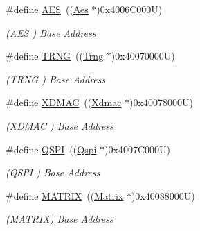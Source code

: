 \begin{DoxyCompactItemize}
\mbox{\label{group__SAME70J21__base_ga5412ac9ff64f4ab68c289a0da739eaef}} 
\#define \mbox{\hyperlink{group__SAME70J21__base_ga5412ac9ff64f4ab68c289a0da739eaef}{A\+ES}}~((\mbox{\hyperlink{structAes}{Aes}}    $\ast$)0x4006\+C000\+U)
\begin{DoxyCompactList}\small\item\em (A\+ES ) Base Address \end{DoxyCompactList}\item 
\mbox{\label{group__SAME70J21__base_ga4cab97ed4b9b87448b2338e4c13c9862}} 
\#define \mbox{\hyperlink{group__SAME70J21__base_ga4cab97ed4b9b87448b2338e4c13c9862}{T\+R\+NG}}~((\mbox{\hyperlink{structTrng}{Trng}}   $\ast$)0x40070000\+U)
\begin{DoxyCompactList}\small\item\em (T\+R\+NG ) Base Address \end{DoxyCompactList}\item 
\mbox{\label{group__SAME70J21__base_ga605482ac0afa782a315f3b556c2f018b}} 
\#define \mbox{\hyperlink{group__SAME70J21__base_ga605482ac0afa782a315f3b556c2f018b}{X\+D\+M\+AC}}~((\mbox{\hyperlink{structXdmac}{Xdmac}}  $\ast$)0x40078000\+U)
\begin{DoxyCompactList}\small\item\em (X\+D\+M\+AC ) Base Address \end{DoxyCompactList}\item 
\mbox{\label{group__SAME70J21__base_gac24e1e8116a508fa623bdaf91e7f9b63}} 
\#define \mbox{\hyperlink{group__SAME70J21__base_gac24e1e8116a508fa623bdaf91e7f9b63}{Q\+S\+PI}}~((\mbox{\hyperlink{structQspi}{Qspi}}   $\ast$)0x4007\+C000\+U)
\begin{DoxyCompactList}\small\item\em (Q\+S\+PI ) Base Address \end{DoxyCompactList}\item 
\mbox{\label{group__SAME70J21__base_gaf1d98fb728b5c7300f80dd782702d1dd}} 
\#define \mbox{\hyperlink{group__SAME70J21__base_gaf1d98fb728b5c7300f80dd782702d1dd}{M\+A\+T\+R\+IX}}~((\mbox{\hyperlink{structMatrix}{Matrix}} $\ast$)0x40088000\+U)
\begin{DoxyCompactList}\small\item\em (M\+A\+T\+R\+IX) Base Address \end{DoxyCompactList}\item 

\end{DoxyCompactItemize}
